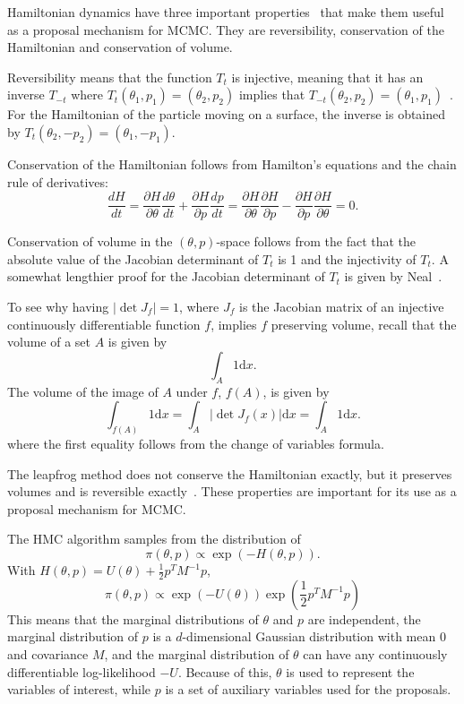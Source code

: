 \documentclass[english,twoside,openright]{HYgraduMLDS}
\newcommand{\dx}{\mathrm{d}}
\begin{document}
Hamiltonian dynamics have three important properties~\cite{neal2012mcmc} 
that make them useful as a
proposal mechanism for MCMC. They are reversibility, 
conservation of the Hamiltonian and conservation of volume.

Reversibility means that the function \(T_t\) is injective, meaning that
it has an inverse \(T_{-t}\) where \(T_t(\theta_1, p_1) = (\theta_2, p_2)\)
implies that \(T_{-t}(\theta_2, p_2) = (\theta_1, p_1)\)~\cite{neal2012mcmc}.
For the Hamiltonian of the particle moving on a surface, the inverse 
is obtained by \(T_t(\theta_2, -p_2) = (\theta_1, -p_1)\).

Conservation of the Hamiltonian follows from Hamilton's equations and the 
chain rule of derivatives:
\[
    \frac{dH}{dt} = \frac{\partial H}{\partial \theta}\frac{d \theta}{dt}
    + \frac{\partial H}{\partial p}\frac{dp}{dt}
    = \frac{\partial H}{\partial \theta}\frac{\partial H}{\partial p}
    - \frac{\partial H}{\partial p}\frac{\partial H}{\partial \theta}
    = 0.
\]

Conservation of volume in the \((\theta, p)\)-space follows from the fact that 
the absolute value of the Jacobian determinant of \(T_t\) is 1 and the 
injectivity of \(T_t\). A somewhat 
lengthier proof for the Jacobian determinant of \(T_t\) is given by 
Neal~\cite{neal2012mcmc}. 

To see why 
having \(|\det J_f| = 1\), where \(J_f\) is the Jacobian matrix of an injective 
continuously differentiable function \(f\), 
implies \(f\) preserving volume, recall that the volume of a set 
\(A\) is given by 
\[
    \int_A 1\dx x.
\]
The volume of the image of \(A\) under \(f\), \(f(A)\), is given by
\[
    \int_{f(A)}1\dx x = \int_{A}|\det J_f(x)|\dx x = \int_A 1\dx x.
\]
where the first equality follows from the change of variables formula.

The leapfrog method does not conserve the Hamiltonian exactly, but it 
preserves volumes and is reversible exactly~\cite{neal2012mcmc}. 
These properties are important for its use as a proposal mechanism for MCMC.

The HMC algorithm samples from the distribution of~\cite{neal2012mcmc}
\[
    \pi(\theta, p) \propto \exp(-H(\theta, p)).
\]
With \(H(\theta, p) = U(\theta) + \frac{1}{2}p^{T}M^{-1}p\),
\[
    \pi(\theta, p) \propto \exp(-U(\theta))\exp\left(\frac{1}{2}p^{T}M^{-1}p\right)
\]
This means that the marginal distributions of \(\theta\) and \(p\) are 
independent, the marginal distribution of \(p\) is a \(d\)-dimensional
Gaussian distribution 
with mean 0 and covariance \(M\), and the marginal distribution of
\(\theta\) can have any continuously differentiable log-likelihood \(-U\).
Because of this, \(\theta\) is used to represent the variables of interest,
while \(p\) is a set of auxiliary variables used for the proposals.
\end{document}
